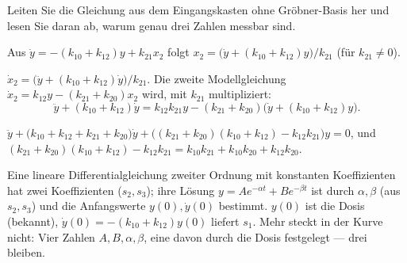 \begin{aufgabe}
Leiten Sie die Gleichung aus dem Eingangskasten ohne Gröbner-Basis her und lesen Sie daran ab, warum genau drei Zahlen messbar sind.

\loesung
{}
Aus $\dot y = -(k_{10} + k_{12})y + k_{21}x_2$ folgt $x_2 = \bigl(\dot y + (k_{10} + k_{12})y\bigr)/k_{21}$ (für $k_{21}\ne0$).

$\dot x_2 = \bigl(\ddot y + (k_{10} + k_{12})\dot y\bigr)/k_{21}$. Die zweite Modellgleichung $\dot x_2 = k_{12}y - (k_{21} + k_{20})x_2$ wird, mit $k_{21}$ multipliziert:
\[ \ddot y + (k_{10} + k_{12})\dot y = k_{12}k_{21}y - (k_{21} + k_{20})\bigl(\dot y + (k_{10} + k_{12})y\bigr). \]

$\ddot y + \bigl(k_{10} + k_{12} + k_{21} + k_{20}\bigr)\dot y + \bigl((k_{21} + k_{20})(k_{10} + k_{12}) - k_{12}k_{21}\bigr)y = 0$, und $(k_{21} + k_{20})(k_{10} + k_{12}) - k_{12}k_{21} = k_{10}k_{21} + k_{10}k_{20} + k_{12}k_{20}$. \checkmark

Eine lineare Differentialgleichung zweiter Ordnung mit konstanten Koeffizienten hat zwei Koeffizienten ($s_2, s_3$); ihre Lösung $y = Ae^{-\alpha t} + Be^{-\beta t}$ ist durch $\alpha, \beta$ (aus $s_2, s_3$) und die Anfangswerte $y(0), \dot y(0)$ bestimmt. $y(0)$ ist die Dosis (bekannt), $\dot y(0) = -(k_{10} + k_{12})y(0)$ liefert $s_1$. Mehr steckt in der Kurve nicht: Vier Zahlen $A, B, \alpha, \beta$, eine davon durch die Dosis festgelegt --- drei bleiben.

\begin{center}
\begin{minipage}{0.88\textwidth}
\end{minipage}
\end{center}
\end{aufgabe}

